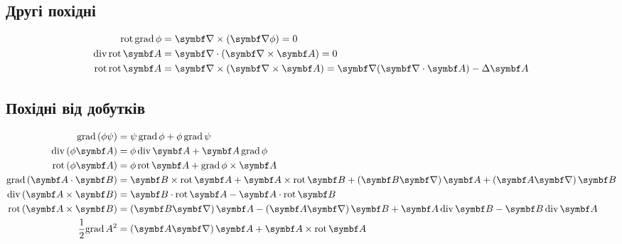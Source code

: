 \subsection{Другі похідні}

\begin{align}
	\mathrm{rot}\,\mathrm{grad}\,\phi    & = \rot(\vect{\nabla}\phi)  = 0                                             \\
	\mathrm{div}\,\mathrm{rot}\,\vect{A} & = \divg(\rot\vect{A})  = 0                                                 \\
	\mathrm{rot}\,\mathrm{rot}\,\vect{A} & = \rot(\rot\vect{A})  = \vect{\nabla}(\divg\vect{A}) - \Laplasian \vect{A}
\end{align}

\subsection{Похідні від добутків}

\begin{align}
	\mathrm{grad}\,(\phi \psi)             & = \psi\,\mathrm{grad}\,\phi +\phi\, \mathrm{grad}\,\psi                                                                                                                           \\
	\mathrm{div}\,(\phi \vect{A})          & = \phi\,\mathrm{div}\,\vect{A} + \vect{A}\,\mathrm{grad}\,\phi                                                                                                                    \\
	\mathrm{rot}\,(\phi \vect{A})          & = \phi\,\mathrm{rot}\,\vect{A} + \mathrm{grad}\,\phi \times \vect{A}                                                                                                              \\
	\mathrm{grad}\,(\vect{A}\cdot\Bfield) & = \Bfield\times\mathrm{rot}\,\vect{A} + \vect{A}\times\mathrm{rot}\,\Bfield + \left( \Bfield\vect{\nabla}\right)\vect{A} + \left( \vect{A}\vect{\nabla}\right)\Bfield         \\
	\mathrm{div}\,(\vect{A}\times\Bfield) & = \Bfield\cdot\mathrm{rot}\,\vect{A} - \vect{A}\cdot\mathrm{rot}\,\Bfield                                                                                                       \\
	\mathrm{rot}\,(\vect{A}\times\Bfield) & = \left( \Bfield\vect{\nabla}\right)\vect{A} - \left( \vect{A}\vect{\nabla}\right)\Bfield + 	\vect{A}\,\mathrm{div}\,\Bfield - \Bfield\,\mathrm{div}\,\vect{A} \label{rotvect} \\
	\frac12\mathrm{grad}\,A^2              & =  \left( \vect{A}\vect{\nabla}\right)\vect{A} + \vect{A}\times\mathrm{rot}\,\vect{A}
\end{align}



